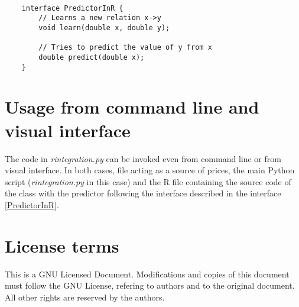 \documentclass[11pt,a4paper]{article}
\begin{document}
\lstset{language=Java,frame=single,tabsize=4,basicstyle=\tiny}
\begin{lstlisting}

    interface PredictorInR {
        // Learns a new relation x->y
        void learn(double x, double y);

        // Tries to predict the value of y from x
        double predict(double x);
    }

\end{lstlisting}
\label{PredictorInR}




\section{Usage from command line and visual interface}

The code in \emph{rintegration.py} can be invoked even from command line or
from visual interface. In both cases, file acting as a source of prices,
the main Python script (\emph{rintegration.py} in this case) and the R file
containing the source code of the class with the predictor following the 
interface described in the interface \ref{PredictorInR}.


\section{License terms}
This is a GNU Licensed Document. Modifications and copies of this document
must follow the GNU License, refering to authors and to the original document.
All other rights are reserved by the authors.
\end{document}

